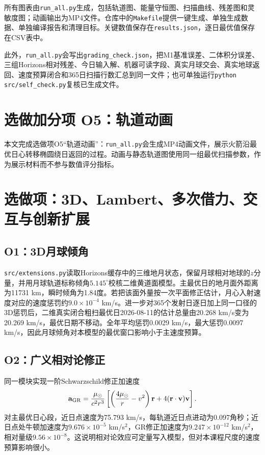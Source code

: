 \documentclass[11pt,a4paper]{ctexart}
\begin{document}
所有图表由\texttt{run\_all.py}生成，包括轨道图、能量守恒图、扫描曲线、残差图和灵敏度图；动画输出为MP4文件。仓库中的\texttt{Makefile}提供一键生成、单独生成数据、单独编译报告和清理目标。关键数值保存在\texttt{results.json}，逐日最优值保存在CSV表中。

此外，\texttt{run\_all.py}会写出\texttt{grading\_check.json}，把M1基准误差、二体积分误差、三组Horizons相对残差、今日输入解、机器可读字段、真实月球交会、真实地球返回、速度预算闭合和365日扫描行数汇总到同一文件；也可单独运行\texttt{python src/self\_check.py}复核已生成文件。

\section{选做加分项 O5：轨道动画}

本文完成选做项O5“轨道动画”：\texttt{run\_all.py}会生成MP4动画文件，展示火箭沿最优日心转移椭圆绕日返回的过程。动画与静态轨道图使用同一组最优扫描参数，作为展示材料而不参与数值评分指标。

\section{选做项：3D、Lambert、多次借力、交互与创新扩展}

\subsection*{O1：3D月球倾角}

\texttt{src/extensions.py}读取Horizons缓存中的三维地月状态，保留月球相对地球的$z$分量，并用月球轨道标称倾角$5.145^\circ$校核二维黄道面模型。主最优日的地月面外距离为11731 km，瞬时倾角为1.84度。若把该面外量按一次平面修正估计，月心入射速度对应的速度惩罚约$9.0\times10^{-4}$ km/s。进一步对365个发射日逐日加上同一口径的3D惩罚后，二维真实闭合粗扫最优日2026-08-11的估计总量由20.268 km/s变为20.269 km/s，最优日期不移动。全年平均惩罚0.0029 km/s，最大惩罚0.0097 km/s，因此月球倾角对本模型的最优窗口影响小于主速度预算。

\subsection*{O2：广义相对论修正}

同一模块实现一阶Schwarzschild修正加速度
\[
\mathbf a_{\rm GR}=\frac{\mu_\odot}{c^2r^3}\left[\left(\frac{4\mu_\odot}{r}-v^2\right)\mathbf r
        +4(\mathbf r\cdot\mathbf v)\mathbf v\right].
\]
对主最优日心段，近日点速度为75.793 km/s，每轨道近日点进动为0.097角秒；近日点处牛顿加速度为$9.676\times10^{-5}$ km/s$^2$，GR修正加速度为$9.247\times10^{-12}$ km/s$^2$，相对量级$9.56\times10^{-8}$。这说明相对论效应可定量写入模型，但对本课程尺度的速度预算影响很小。
\end{document}
